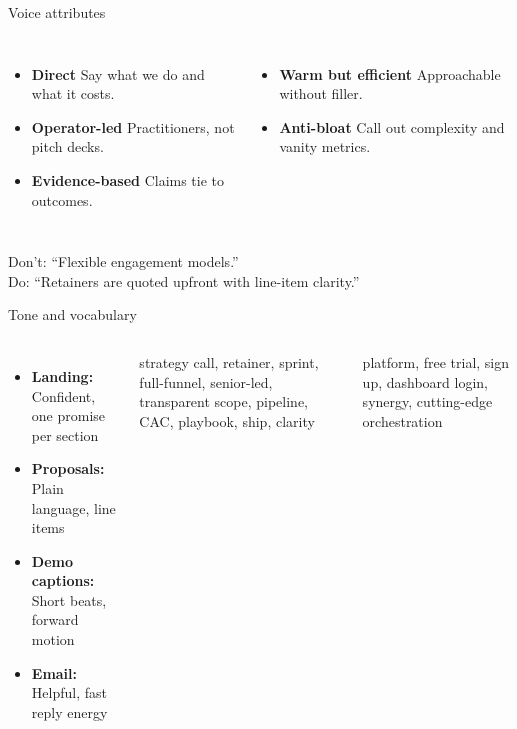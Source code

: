 \documentclass[aspectratio=169,10pt]{beamer}
\begin{document}
\begin{frame}{Voice attributes}
  \begin{columns}[T,onlytextwidth]
    \begin{itemize}
      \item \textbf{Direct} Say what we do and what it costs.
      \item \textbf{Operator-led} Practitioners, not pitch decks.
      \item \textbf{Evidence-based} Claims tie to outcomes.
    \end{itemize}
    \begin{itemize}
      \item \textbf{Warm but efficient} Approachable without filler.
      \item \textbf{Anti-bloat} Call out complexity and vanity metrics.
    \end{itemize}
  \end{columns}

  \vspace{1em}
  \vspace{0.3em}

  {\color{collinsSecondary}Don't:} ``Flexible engagement models.''\\
  {\color{collinsGreen}Do:} ``Retainers are quoted upfront with line-item clarity.''
\end{frame}

\begin{frame}{Tone and vocabulary}
  \begin{columns}[T,onlytextwidth]
    \vspace{0.4em}
    \begin{itemize}
      \item \textbf{Landing:} Confident, one promise per section
      \item \textbf{Proposals:} Plain language, line items
      \item \textbf{Demo captions:} Short beats, forward motion
      \item \textbf{Email:} Helpful, fast reply energy
    \end{itemize}
    \vspace{0.4em}
    {\small strategy call, retainer, sprint, full-funnel, senior-led, transparent scope, pipeline, CAC, playbook, ship, clarity}

    \vspace{0.6em}
    \vspace{0.4em}
    {\small\color{collinsSecondary} platform, free trial, sign up, dashboard login, synergy, cutting-edge orchestration}
  \end{columns}
\end{frame}
\end{document}

